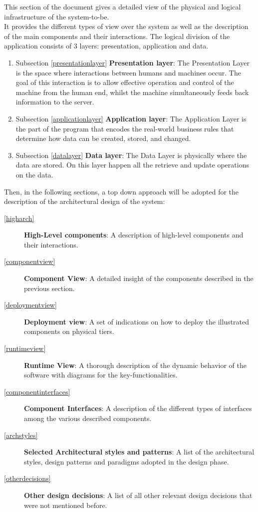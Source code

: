 This section of the document gives a detailed view of the physical and logical infrastructure of the system-to-be. 
\\It provides the different types of view over the system as well as the description of the main components and their interactions.
The logical division of the application consists of 3 layers: presentation, application and data.
\begin{enumerate}
	\item Subsection \ref{presentationlayer} \textbf{Presentation layer}: The Presentation Layer is the space where interactions between humans and machines occur. The goal of this interaction is to allow effective operation and control of the machine from the human end, whilst the machine simultaneously feeds back information to the server.
	\item Subsection \ref{applicationlayer} \textbf{Application layer}: The Application Layer is the part of the program that encodes the real-world business rules that determine how data can be created, stored, and changed.
	\item Subsection \ref{datalayer} \textbf{Data layer}: The Data Layer is physically where the data are stored. On this layer happen all the retrieve and update operations on the data. 
\end{enumerate}

Then, in the following sections, a top down approach will be adopted for the description of the architectural design of the system:
\begin{description}
	\item[\ref{higharch}] \textbf{High-Level components}: A description of high-level components and their interactions.
	\item[\ref{componentview}] \textbf{Component View}: A detailed insight of the components described in the previous section.
	\item[\ref{deploymentview}] \textbf{Deployment view}: A set of indications on how to deploy the illustrated components on physical tiers.
	\item[\ref{runtimeview}] \textbf{Runtime View}: A thorough description of the dynamic behavior of the software with diagrams for the key-functionalities.
	\item[\ref{componentinterfaces}] \textbf{Component Interfaces}: A description of the different types of interfaces among the various described components.
	\item[\ref{archstyles}] \textbf{Selected Architectural styles and patterns}: A list of the architectural styles, design patterns and paradigms adopted in the design phase.
	\item[\ref{otherdecisions}] \textbf{Other design decisions}: A list of all other relevant design decisions that were not mentioned before.
\end{description}

